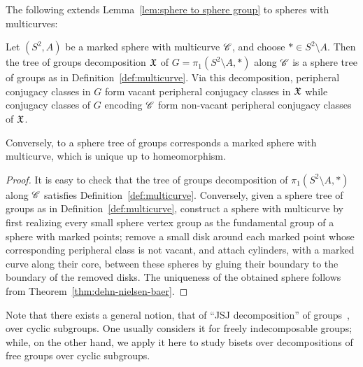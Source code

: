 \documentclass{amsart}
\begin{document}
\noindent The following extends Lemma~\ref{lem:sphere to sphere group} to
spheres with multicurves:
\begin{lem}\label{lem:MultToAlgMult}
  Let $(S^2,A)$ be a marked sphere with multicurve ${\mathscr C}$, and choose
  $*\in S^2\setminus A$. Then the tree of groups decomposition ${\mathfrak X}$
  of $G=\pi_1(S^2\setminus A,*)$ along ${\mathscr C}$ is a sphere tree of
  groups as in Definition~\ref{def:multicurve}. Via this
  decomposition, peripheral conjugacy classes in $G$ form vacant
  peripheral conjugacy classes in ${\mathfrak X}$ while conjugacy classes of $G$
  encoding ${\mathscr C}$ form non-vacant peripheral conjugacy classes of
  ${\mathfrak X}$.
  
   Conversely, to a sphere tree of groups corresponds a marked
  sphere with multicurve, which is unique up to homeomorphism. 
\end{lem}
\begin{proof}
  It is easy to check that the tree of groups decomposition of
  $\pi_1(S^2\setminus A,*)$ along ${\mathscr C}$ satisfies
  Definition~\ref{def:multicurve}. Conversely, given a sphere tree of
  groups as in Definition~\ref{def:multicurve}, construct a sphere
  with multicurve by first realizing every small sphere vertex group
  as the fundamental group of a sphere with marked points; remove a
  small disk around each marked point whose corresponding peripheral
  class is not vacant, and attach cylinders, with a marked curve along
  their core, between these spheres by gluing their boundary to the
  boundary of the removed disks. The uniqueness of the obtained sphere
  follows from Theorem~\ref{thm:dehn-nielsen-baer}.
\end{proof}

Note that there exists a general notion, that of ``JSJ decomposition''
of groups~\cite{rips-sela:jsj}, over cyclic subgroups. One usually
considers it for freely indecomposable groups; while, on the other
hand, we apply it here to study bisets over decompositions of
free groups over cyclic subgroups.
\end{document}
